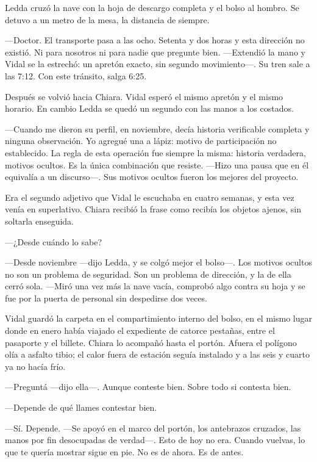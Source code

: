 Ledda cruzó la nave con la hoja de descargo completa y el bolso al hombro. Se detuvo a un metro de la mesa, la distancia de siempre.

---Doctor. El transporte pasa a las ocho. Setenta y dos horas y esta dirección no existió. Ni para nosotros ni para nadie que pregunte bien. ---Extendió la mano y Vidal se la estrechó: un apretón exacto, sin segundo movimiento---. Su tren sale a las 7:12. Con este tránsito, salga 6:25.

Después se volvió hacia Chiara. Vidal esperó el mismo apretón y el mismo horario. En cambio Ledda se quedó un segundo con las manos a los costados.

---Cuando me dieron su perfil, en noviembre, decía historia verificable completa y ninguna observación. Yo agregué una a lápiz: motivo de participación no establecido. La regla de esta operación fue siempre la misma: historia verdadera, motivos ocultos. Es la única combinación que resiste. ---Hizo una pausa que en él equivalía a un discurso---. Sus motivos ocultos fueron los mejores del proyecto.

Era el segundo adjetivo que Vidal le escuchaba en cuatro semanas, y esta vez venía en superlativo. Chiara recibió la frase como recibía los objetos ajenos, sin soltarla enseguida.

---¿Desde cuándo lo sabe?

---Desde noviembre ---dijo Ledda, y se colgó mejor el bolso---. Los motivos ocultos no son un problema de seguridad. Son un problema de dirección, y la de ella cerró sola. ---Miró una vez más la nave vacía, comprobó algo contra su hoja y se fue por la puerta de personal sin despedirse dos veces.

Vidal guardó la carpeta en el compartimiento interno del bolso, en el mismo lugar donde en enero había viajado el expediente de catorce pestañas, entre el pasaporte y el billete. Chiara lo acompañó hasta el portón. Afuera el polígono olía a asfalto tibio; el calor fuera de estación seguía instalado y a las seis y cuarto ya no hacía frío.

---Preguntá ---dijo ella---. Aunque conteste bien. Sobre todo si contesta bien.

---Depende de qué llames contestar bien.

---Sí. Depende. ---Se apoyó en el marco del portón, los antebrazos cruzados, las manos por fin desocupadas de verdad---. Esto de hoy no era. Cuando vuelvas, lo que te quería mostrar sigue en pie. No es de ahora. Es de antes.

